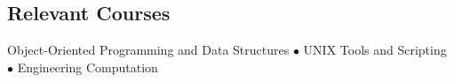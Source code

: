 

\subsection*{Relevant Courses}

Object-Oriented Programming and Data Structures $\bullet$ UNIX Tools and Scripting $\bullet$ Engineering Computation
